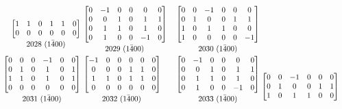 \documentclass[12 pt]{article}%
\begin{document}
\begin{align*}
\begin{bmatrix}
    1 & 1 & 0 & 1 & 1 & 0 \\
    0 & 0 & 0 & 0 & 0 & 0 \\
  \end{bmatrix}
  \atop 2028 \,\, (1\bar400) &
  \begin{bmatrix}
    0 & -1 & 0 & 0 & 0 & 0 \\
    0 & 0 & 1 & 0 & 1 & 1 \\
    0 & 1 & 1 & 0 & 1 & 0 \\
    0 & 1 & 0 & 0 & -1 & 0 \\
  \end{bmatrix}
  \atop 2029 \,\, (1\bar400) &
  \begin{bmatrix}
    0 & 0 & -1 & 0 & 0 & 0 \\
    0 & 1 & 0 & 0 & 1 & 1 \\
    1 & 0 & 1 & 1 & 0 & 0 \\
    1 & 0 & 0 & 0 & 0 & -1 \\
  \end{bmatrix}
  \atop 2030 \,\, (1\bar400) \\
  \begin{bmatrix}
    0 & 0 & 0 & -1 & 0 & 0 \\
    0 & 1 & 0 & 1 & 0 & 1 \\
    1 & 1 & 0 & 1 & 0 & 1 \\
    0 & 0 & 0 & 0 & 0 & 0 \\
  \end{bmatrix}
  \atop 2031 \,\, (1\bar400) &
  \begin{bmatrix}
    -1 & 0 & 0 & 0 & 0 & 0 \\
    0 & 0 & 0 & 1 & 1 & 0 \\
    1 & 1 & 0 & 1 & 1 & 0 \\
    0 & 0 & 0 & 0 & 0 & 0 \\
  \end{bmatrix}
  \atop 2032 \,\, (1\bar400) &
  \begin{bmatrix}
    0 & -1 & 0 & 0 & 0 & 0 \\
    0 & 0 & 1 & 0 & 1 & 1 \\
    0 & 1 & 1 & 0 & 1 & 0 \\
    0 & 1 & 0 & 0 & -1 & 0 \\
  \end{bmatrix}
  \atop 2033 \,\, (1\bar400) &
  \begin{bmatrix}
    0 & 0 & -1 & 0 & 0 & 0 \\
    0 & 1 & 0 & 0 & 1 & 1 \\
    1 & 0 & 1 & 1 & 0 & 0 \\

\end{bmatrix}
\end{align*}
\end{document}
